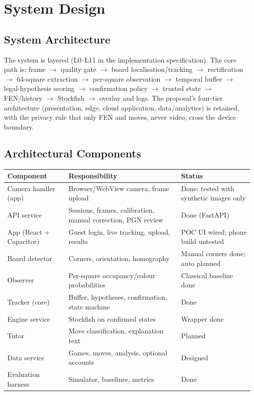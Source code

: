 \chapter{System Design}
\section{System Architecture}
The system is layered (L0--L11 in the implementation specification). The core path is:
frame $\to$ quality gate $\to$ board localisation/tracking $\to$ rectification $\to$ 64-square extraction $\to$
per-square observation $\to$ temporal buffer $\to$ legal-hypothesis scoring $\to$ confirmation policy $\to$ trusted
state $\to$ FEN/history $\to$ Stockfish $\to$ overlay and logs. The proposal's four-tier architecture
(presentation, edge, cloud application, data/analytics) is retained, with the privacy rule that only FEN and moves,
never video, cross the device boundary.

\section{Architectural Components}
\begin{longtable}{p{}p{}p{}}
\toprule Component & Responsibility & Status\\ \midrule
Camera handler (app) & Browser/WebView camera, frame upload & Done; tested with synthetic images only\\
API service & Sessions, frames, calibration, manual correction, PGN review & Done (FastAPI)\\
App (React + Capacitor) & Guest login, live tracking, upload, results & POC UI wired; phone build untested\\
Board detector & Corners, orientation, homography & Manual corners done; auto planned\\
Observer & Per-square occupancy/colour probabilities & Classical baseline done\\
Tracker (core) & Buffer, hypotheses, confirmation, state machine & Done\\
Engine service & Stockfish on confirmed states & Wrapper done\\
Tutor & Move classification, explanation text & Planned\\
Data service & Games, moves, analysis, optional accounts & Designed\\
Evaluation harness & Simulator, baselines, metrics & Done\\
\bottomrule
\end{longtable}

